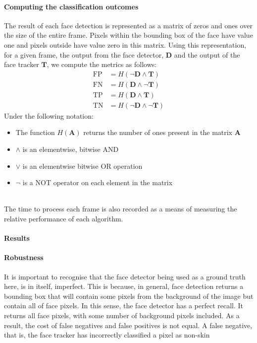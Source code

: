 \paragraph{Computing the classification outcomes} The result of each face detection is represented as a matrix of zeros and ones over the size of the entire frame.
Pixels within the bounding box of the face have value one and pixels outside have value zero in this matrix. Using this representation, for a given frame, the output from the face detector, $\mathbf{D}$ and the output of the face tracker $\mathbf{T}$, we compute the metrics as follows: 
\begin{align*}
    \mathrm{FP} &= H(\neg{\mathbf{D}} \wedge \mathbf{T}) \\
    \mathrm{FN} &= H(\mathbf{D} \wedge \neg{\mathbf{T}})\\
    \mathrm{TP} &= H(\mathbf{D} \wedge \mathbf{T})\\
    \mathrm{TN} &= H(\neg{\mathbf{D}} \wedge \neg{\mathbf{T}})
\end{align*}
Under the following notation: 
\begin{itemize}
    \item The function $H(\mathbf{A})$ returns the number of ones present in the matrix $\mathbf{A}$
    \item $\wedge$ is an elementwise, bitwise AND 
    \item $\vee$ is an elementwise bitwise OR operation 
    \item $\neg$ is a NOT operator on each element in the matrix
\\\\
\end{itemize}
The time to process each frame is also recorded as a means of measuring the relative performance of each algorithm.

\paragraph{Results}

\paragraph{Robustness}
It is important to recognise that the face detector being used as a ground truth here, is in itself, imperfect. This is because, in general, face detection returns a bounding box
that will contain some pixels from the background of the image but contain all of face pixels. In this sense, the face detector has a perfect recall. 
It returns all face pixels, with some number of background pixels included. 
As a result, the cost of false negatives and false positives is not equal.  
A false negative, that is, the face tracker has incorrectly classified a pixel as non-skin

